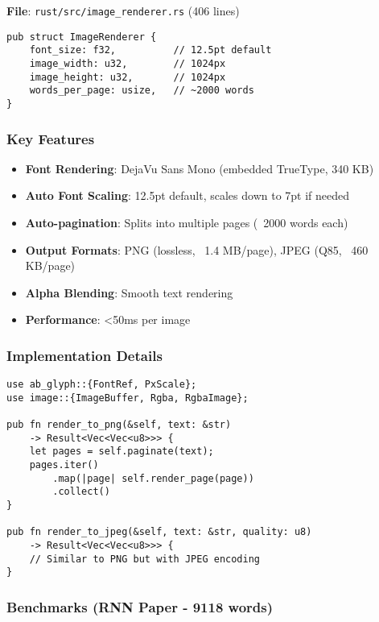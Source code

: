 \textbf{File}: \texttt{rust/src/image\_renderer.rs} (406 lines)

\begin{verbatim}
pub struct ImageRenderer {
    font_size: f32,          // 12.5pt default
    image_width: u32,        // 1024px
    image_height: u32,       // 1024px
    words_per_page: usize,   // ~2000 words
}
\end{verbatim}

\subsubsection{Key Features}

\begin{itemize}
    \item \textbf{Font Rendering}: DejaVu Sans Mono (embedded TrueType, 340 KB)
    \item \textbf{Auto Font Scaling}: 12.5pt default, scales down to 7pt if needed
    \item \textbf{Auto-pagination}: Splits into multiple pages (~2000 words each)
    \item \textbf{Output Formats}: PNG (lossless, ~1.4 MB/page), JPEG (Q85, ~460 KB/page)
    \item \textbf{Alpha Blending}: Smooth text rendering
    \item \textbf{Performance}: <50ms per image
\end{itemize}

\subsubsection{Implementation Details}

\begin{verbatim}
use ab_glyph::{FontRef, PxScale};
use image::{ImageBuffer, Rgba, RgbaImage};

pub fn render_to_png(&self, text: &str) 
    -> Result<Vec<Vec<u8>>> {
    let pages = self.paginate(text);
    pages.iter()
        .map(|page| self.render_page(page))
        .collect()
}

pub fn render_to_jpeg(&self, text: &str, quality: u8)
    -> Result<Vec<Vec<u8>>> {
    // Similar to PNG but with JPEG encoding
}
\end{verbatim}

\subsubsection{Benchmarks (RNN Paper - 9118 words)}

